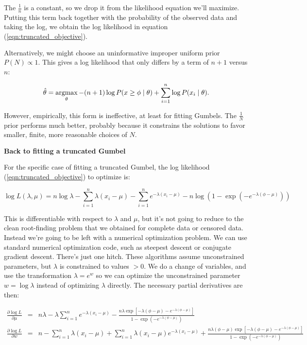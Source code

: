 The $\frac{1}{n}$ is a constant, so we drop it from the likelihood
equation we'll maximize. Putting this term back together with the
probability of the observed data and taking the log, we obtain the log
likelihood in equation (\ref{eqn:truncated_objective}).

Alternatively, we might choose an uninformative improper uniform prior
$P(N) \propto 1$. This gives a log likelihood that only differs by a
term of $n+1$ versus $n$:

\begin{equation}
  \hat{\theta} = \mathop{\mathrm{argmax}}\limits_\theta -(n+1) \log P(x \geq \phi \mid \theta) 
                   + \sum_{i=1}^n \log P(x_i \mid \theta).
\end{equation}

However, empirically, this form is ineffective, at least for fitting
Gumbels. The $\frac{1}{N}$ prior performs much better, probably
because it constrains the solutions to favor smaller, finite, more
reasonable choices of $N$.



\textbf{Back to fitting a truncated Gumbel}

For the specific case of fitting a truncated Gumbel, the log
likelihood (\ref{eqn:truncated_objective}) to optimize is:

\[
  \log L(\lambda, \mu) =
     n \log \lambda 
     - \sum_{i=1}^{n} \lambda(x_i - \mu) 
     - \sum_{i=1}^{n} e^{-\lambda(x_i - \mu)}
     - n \log (1 - \exp(-e^{-\lambda(\phi - \mu)}))
\label{eqn:truncated_logL}
\]

This is differentiable with respect to $\lambda$ and $\mu$, but it's
not going to reduce to the clean root-finding problem that we obtained
for complete data or censored data. Instead we're going to be left
with a numerical optimization problem. We can use standard numerical
optimization code, such as steepest descent or conjugate gradient
descent. There's just one hitch. These algorithms assume unconstrained
parameters, but $\lambda$ is constrained to values $>0$. We do a
change of variables, and use the transformation $\lambda = e^w$ so we
can optimize the unconstrained parameter $w = \log \lambda$ instead of
optimizing $\lambda$ directly.  The necessary partial derivatives are
then:

\begin{eqnarray}
\frac{\partial \log L}{\partial \mu} & = &
n \lambda  
- \lambda \sum_{i=1}^{n} e^{-\lambda (x_i - \mu)}
- \frac{n \lambda \exp \left[ -\lambda (\phi - \mu) - e^{- \lambda (\phi - \mu)} \right]}
       {1 - \exp(-e^{-\lambda(\phi - \mu)})}
\label{eqn:truncated_dmu}
\\%
\frac{\partial \log L}{\partial w} & = &
n 
- \sum_{i=1}^{n} \lambda(x_i - \mu) 
+ \sum_{i=1}^{n} \lambda(x_i - \mu) e^{-\lambda (x_i - \mu)}
+ \frac{n\lambda (\phi-\mu) \exp \left[ -\lambda (\phi - \mu) - e^{- \lambda (\phi - \mu)} \right]}
       {1 - \exp(-e^{-\lambda(\phi - \mu)})}
\label{eqn:truncated_dw}
\end{eqnarray}

